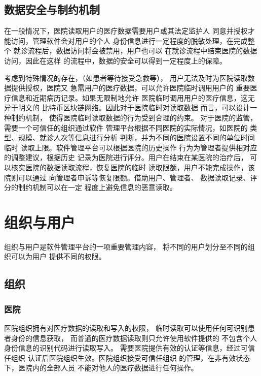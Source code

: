 \documentclass[UTF8]{ctexart}
\begin{document}
    \subsection{数据安全与制约机制}
    \par
    在一般情况下，医院读取用户的医疗数据需要用户或其法定监护人
    同意并授权才能访问，管理软件会对用户的个人
    身份信息进行一定程度的脱敏处理，在完成整个
    就诊流程后，数据访问将会被禁用，用户也可以
    在就诊流程中结束医院的数据访问，因此在这样
    的流程中，数据的安全可以得到一定程度上的保障。
    
    \par
    考虑到特殊情况的存在，（如患者等待接受急救等），
    用户无法及时为医院读取数据提供授权，医院又
    急需用户的医疗数据，可以允许医院临时调用用户的
    重要医疗信息和近期病历记录。如果无限制地允许
    医院临时调用用户的医疗信息，这无异于明文的
    比特币区块链网络。因此对于医院临时对读取数据
    而言，可以设计一种制约机制，
    使得医院临时读取数据的行为受到合理的约束。
    对于医院的监管，需要一个可信任的组织通过软件
    管理平台根据不同医院的实际情况，如医院的
    类型、规模、就诊人次等信息进行分析
    判断，并为不同的医院设置不同的单位时间临时
    读取上限。软件管理平台可以根据医院的历史操作
    行为为管理者提供相对应的调整建议，根据历史
    记录为医院进行评分。用户在结束在某医院的治疗后，
    可以核实医院的数据读取流程，恢复医院的临时
    读取限额，用户不能完成操作，该院则可以通过
    向管理者申诉等恢复限额。借助用户、管理者、
    数据读取记录、评分的制约机制可以在一定
    程度上避免信息的恶意读取。

    \section{组织与用户}
    \par
    组织与用户是软件管理平台的一项重要管理内容，
    将不同的用户划分至不同的组织可以为用户
    提供不同的权限。
    \subsection{组织}
    \subsubsection{医院}
    \par
    医院组织拥有对医疗数据的读取和写入的权限，
    临时读取可以使用任何可识别患者身份的信息获取，
    而普通的医疗数据读取则只允许使用软件提供的
    不包含个人身份信息的识别代码进行读取写入。
    需要医院提供有效的认证等信息，经过可信任组织
    认证后医院组织生效。医院组织接受可信任组织
    的管理，在非有效状态下，医院内的全部人员
    不能对他人的医疗数据进行任何操作。
\end{document}
